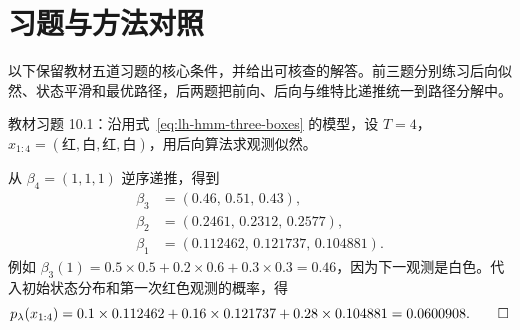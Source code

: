 \section{习题与方法对照}
\label{sec:lh-hmm-exercises}

以下保留教材五道习题的核心条件，并给出可核查的解答。前三题分别练习后向似然、状态平滑和最优路径，后两题把前向、后向与维特比递推统一到路径分解中。

\begin{example}
\label{ex:lh-hmm-ex-backward}
教材习题 10.1：沿用式~\eqref{eq:lh-hmm-three-boxes} 的模型，设 $T=4$，$x_{1:4}=(\text{红},\text{白},\text{红},\text{白})$，用后向算法求观测似然。
\end{example}
\begin{solve}
从 $\beta_4=(1,1,1)$ 逆序递推，得到
\[
 \begin{aligned}
 \beta_3&=(0.46,\,0.51,\,0.43),\\
 \beta_2&=(0.2461,\,0.2312,\,0.2577),\\
 \beta_1&=(0.112462,\,0.121737,\,0.104881).
 \end{aligned}
\]
例如 $\beta_3(1)=0.5\times0.5+0.2\times0.6+0.3\times0.3=0.46$，因为下一观测是白色。代入初始状态分布和第一次红色观测的概率，得
\[
 p_\lambda(x_{1:4})
 =0.1\times0.112462+0.16\times0.121737+0.28\times0.104881
 =0.0600908.\qedhere
\]
\end{solve}

